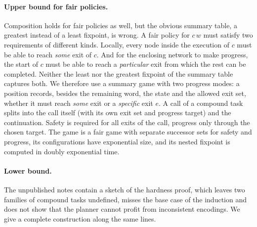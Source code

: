 \paragraph{Upper bound for fair policies.}
Composition holds for fair policies as well, but the obvious summary table, a greatest instead of a
least fixpoint, is wrong. A fair policy for $c\,w$ must satisfy two requirements of different
kinds. Locally, every node inside the execution of $c$ must be able to reach \emph{some} exit of
$c$. And for the enclosing network to make progress, the start of $c$ must be able to reach a
\emph{particular} exit from which the rest can be completed. Neither the least nor the greatest
fixpoint of the summary table captures both. We therefore use a summary game with two progress
modes: a position records, besides the remaining word, the state and the allowed exit set, whether
it must reach \emph{some} exit or a \emph{specific} exit $e$. A call of a compound task splits into
the call itself (with its own exit set and progress target) and the continuation. Safety is
required for all exits of the call, progress only through the chosen target. The game is a fair
game with separate successor sets for safety and progress, its configurations have exponential
size, and its nested fixpoint is computed in doubly exponential time.

\paragraph{Lower bound.}
The unpublished notes contain a sketch of the hardness proof, which leaves two families of
compound tasks undefined, misses the base case of the induction and does not show that the planner
cannot profit from inconsistent encodings. We give a complete construction along the same lines.


